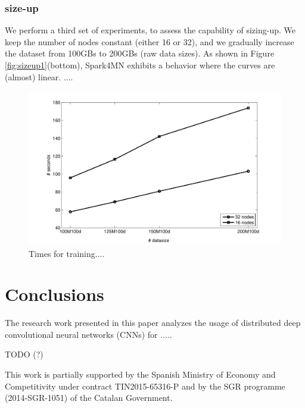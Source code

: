 \documentclass[smallextended]{svjour3}       %
\begin{document}
\subsubsection{size-up} We perform a third set of experiments, to assess the capability of sizing-up. We keep the number of nodes constant (either 16 or 32), and we gradually increase the dataset from 100GBs to 200GBs (raw data sizes). As shown in Figure \ref{fig:sizeup1}(bottom), Spark4MN exhibits a behavior where the curves are (almost) linear. ....

\begin{figure}[tb!]
\begin{center}
\centerline{\includegraphics[width=0.75\linewidth]{img/sizeup1.pdf}}
\caption{Times for training....}
\label{fig:speedup1}
\end{center}
\vspace{-0.5cm}
\end{figure}

%
\section{Conclusions}
%
The research work presented in this paper analyzes the usage of distributed deep convolutional neural networks (CNNs) for ..... 

TODO (?)

\begin{acknowledgements}
This work is partially supported by the Spanish Ministry of Economy and Competitivity under contract TIN2015-65316-P and by the SGR programme (2014-SGR-1051) of the Catalan Government.
\end{acknowledgements}



\end{document}
